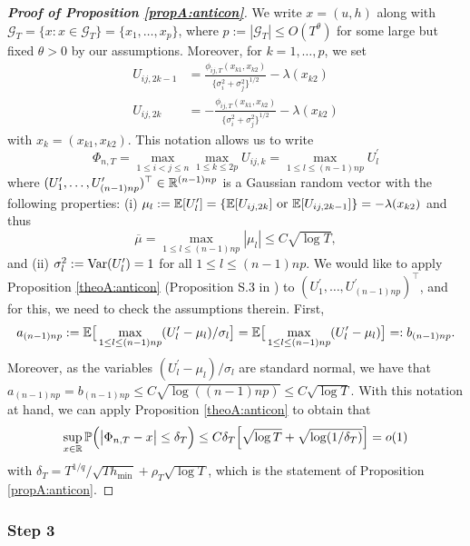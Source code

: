 \begin{proof}[\textnormal{\textbf{Proof of Proposition \ref{propA:anticon}}}] 

We write $x = (u,h)$ along with $\mathcal{G}_T = \{ x : x \in \mathcal{G}_T \} = \{x_1,\ldots,x_p\}$, where $p := |\mathcal{G}_T| \le O(T^\theta)$ for some large but fixed $\theta > 0$ by our assumptions. Moreover, for $k = 1,\ldots,p$, we set 
\begin{align*}
U_{ij, 2k-1} & = \frac{\phi_{ij, T}(x_{k1},x_{k2})}{\{{\sigma}_i^2 + {\sigma}_j^2\}^{1/2}} - \lambda(x_{k2}) \\
U_{ij, 2k} & = -\frac{\phi_{ij, T}(x_{k1},x_{k2})}{\{{\sigma}_i^2 + {\sigma}_j^2\}^{1/2}} - \lambda(x_{k2}) 
\end{align*}
with $x_k = (x_{k1},x_{k2})$. This notation allows us to write
\[ \Phi_{n, T} = \max_{1\le i < j \le n} \max_{1 \le k \le 2p} U_{ij, k} = \max_{1 \leq l \leq (n-1)np} U^\prime_l\]
where $(U^\prime_{1},\ldots,U^\prime_{(n-1)np})^\top \in \mathbb{R}^{(n-1)np}$ is a Gaussian random vector with the following properties: (i) $\mu_{l} := \mathbb{E}[U^\prime_l] = \{\mathbb{E}[U_{ij, 2k}] \text{ or }\mathbb{E}[U_{ij, 2k-1}]\}= - \lambda(x_{k2}) $ and thus
$$\overline{\mu} = \max_{1\leq l \leq (n-1)np} |\mu_{l}| \leq C \sqrt{\log T},$$
and (ii) $\sigma_{l}^2 := \textnormal{Var}(U^\prime_{l}) = 1$ for all $1 \leq l \leq (n-1)np$. We would like to apply \linebreak Proposition \ref{theoA:anticon} (Proposition S.3 in \cite{KhismatullinaVogt2020}) to  $(U^\prime_{1},\ldots,U^\prime_{(n-1)np})^\top$, and for this, we need to check the assumptions therein. First, 
$$a_{(n-1)np} := \mathbb{E}\big[ \max_{1 \le l \le (n-1)np} (U_l^\prime -\mu_l)/\sigma_l \big] =\mathbb{E}\big[ \max_{1 \le l \le (n-1)np} (U_l^\prime-\mu_l) \big] = : b_{(n-1)np}.$$ Moreover, as the variables $(U^\prime_l - \mu_l)/\sigma_l$ are standard normal, we have that \linebreak $a_{(n-1)np} = b_{(n-1)np} \le C\sqrt{\log ((n-1)np)} \leq C \sqrt{\log T}$. With this notation at hand, we can apply Proposition \ref{theoA:anticon} to obtain that 
\[ \sup_{x \in \mathbb{R}} \mathbb{P} \Big( \big| \Phi_{n, T} - x \big| \le \delta_T \Big) \le C \delta_T \Big[ \sqrt{\log T} + \sqrt{ \log(1/\delta_T) } \Big] = o(1) \]
with $\delta_T = T^{1/q} / \sqrt{T h_{\min}} + \rho_T \sqrt{\log T}$, which is the statement of Proposition \ref{propA:anticon}.
\end{proof}

\subsubsection*{Step 3}


